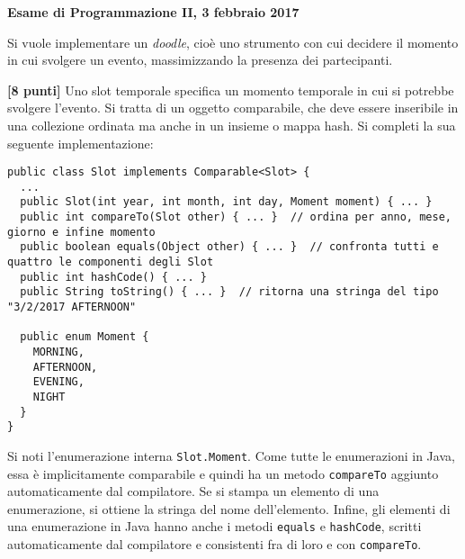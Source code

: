 \documentclass{article}[10pt]
\newcounter{esnu}
\newenvironment{esercizio}{\medskip \noindent {\bf Esercizio\addtocounter{esnu}{1} \arabic{esnu}}}{}
\begin{document}
\begin{center} {\bf Esame di Programmazione II, 3 febbraio 2017}\end{center}

Si vuole implementare un \emph{doodle}, cio\`e uno strumento con cui decidere
il momento in cui svolgere un evento, massimizzando la presenza dei partecipanti.

\begin{esercizio}
\textbf{[8 punti]}
Uno slot temporale specifica un momento temporale in cui si potrebbe svolgere l'evento.
Si tratta di un oggetto comparabile, che deve essere inseribile in una collezione
ordinata ma anche in un insieme o mappa hash. Si completi la sua seguente implementazione:

{\small\begin{verbatim}
public class Slot implements Comparable<Slot> {
  ...
  public Slot(int year, int month, int day, Moment moment) { ... }
  public int compareTo(Slot other) { ... }  // ordina per anno, mese, giorno e infine momento
  public boolean equals(Object other) { ... }  // confronta tutti e quattro le componenti degli Slot
  public int hashCode() { ... }
  public String toString() { ... }  // ritorna una stringa del tipo "3/2/2017 AFTERNOON"

  public enum Moment {
    MORNING,
    AFTERNOON,
    EVENING,
    NIGHT
  }
}
\end{verbatim}}

  \noindent
  Si noti l'enumerazione interna \texttt{Slot.Moment}. Come tutte le enumerazioni in Java,
  essa \`e implicitamente comparabile e quindi ha un metodo \texttt{compareTo}
  aggiunto automaticamente dal compilatore. Se si stampa un elemento di una enumerazione,
  si ottiene la stringa del nome dell'elemento. Infine, gli elementi di una enumerazione
  in Java hanno anche i metodi \texttt{equals} e \texttt{hashCode}, scritti automaticamente
  dal compilatore e consistenti fra di loro e con \texttt{compareTo}.
\end{esercizio}
\end{document}
